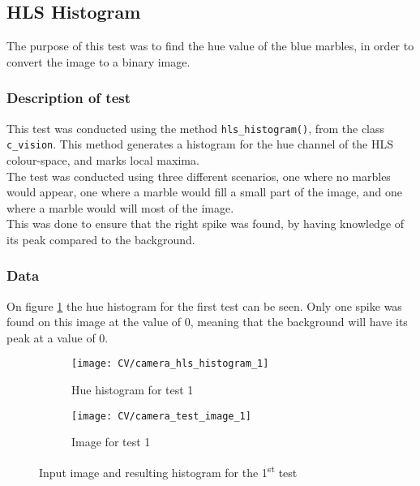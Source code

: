 \documentclass[../Head/Main.tex]{subfiles}
\begin{document}
\subsection{HLS Histogram}
\label{subsec:test_HLS_hist}
The purpose of this test was to find the hue value of the blue marbles, in order to convert the image to a binary image. 


\subsubsection*{Description of test}

This test was conducted using the method \texttt{hls\_histogram()}, from the class \texttt{c\_vision}. This method generates a histogram for the hue channel of the HLS colour-space, and marks local maxima.\\
The test was conducted using three different scenarios, one where no marbles would appear, one where a marble would fill a small part of the image, and one where a marble would will most of the image.\\
This was done to ensure that the right spike was found, by having knowledge of its peak compared to the background.  
\subsubsection*{Data}
On figure \ref{fig:hist_test_1} the hue histogram for the first test can be seen. Only one spike was found on this image at the value of 0, meaning that the background will have its peak at a value of 0. 

\begin{figure}[H]
	\centering
	\begin{subfigure}[b]{0.48\textwidth}
		\centering
		\texttt{[image: CV/camera\_hls\_histogram\_1]}
		\caption{Hue histogram for test 1}
		\label{fig:hist_test_1}
	\end{subfigure}
	\hfill
	\begin{subfigure}[b]{0.5\textwidth}
		\centering
		\texttt{[image: CV/camera\_test\_image\_1]}
		\caption{Image for test 1}
		\label{fig:image_test_1}
	\end{subfigure}
	\caption{Input image and resulting histogram for the 1\textsuperscript{st} test}
	\label{fig:test_1}
\end{figure}
\end{document}
